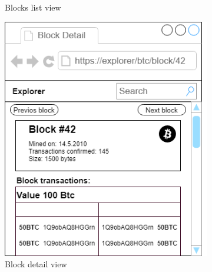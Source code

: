 \begin{figure}[h]
\begin{subfigure}[b]{.4\textwidth}
        \caption{Blocks list view}
        \label{blocksMockup}
    \end{subfigure}
    \begin{subfigure}[b]{.4\textwidth}
        \centering
        \includegraphics[width=1.0\linewidth]{mockups/blockDetail.png}
        \caption{Block detail view}
        \label{blockDetailMockup}
    \end{subfigure}
    \begin{subfigure}[b]{.4\textwidth}
        \centering

\end{subfigure}
\end{figure}
